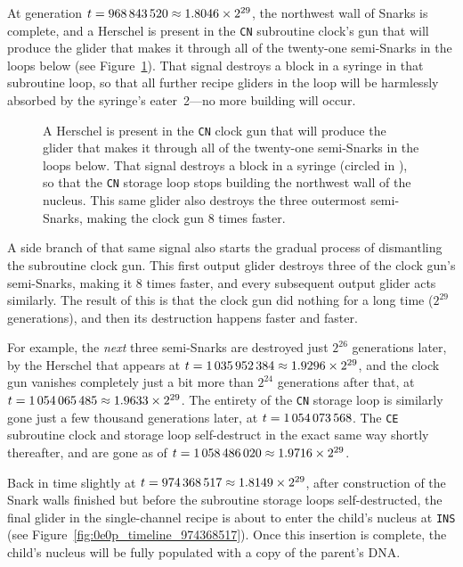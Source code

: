 At generation $t = 968{\,}843{\,}520 \approx 1.8046 \times 2^{29}$, the northwest wall of Snarks is complete, and a Herschel is present in the \texttt{CN} subroutine clock's gun that will produce the glider that makes it through all of the twenty-one semi-Snarks in the loops below (see Figure~\ref{fig:0e0p_timeline_968843520}). That signal destroys a block in a syringe in that subroutine loop, so that all further recipe gliders in the loop will be harmlessly absorbed by the syringe's eater~2---no more building will occur.

\begin{figure}[!htb]
	\centering
	\caption{A Herschel is present in the \texttt{CN} clock gun that will produce the glider that makes it through all of the twenty-one semi-Snarks in the loops below. That signal destroys a block in a syringe (circled in ), so that the \texttt{CN} storage loop stops building the northwest wall of the nucleus. This same glider also destroys the three outermost semi-Snarks, making the clock gun $8$ times faster.}
	\label{fig:0e0p_timeline_968843520}
\end{figure}

A side branch of that same signal also starts the gradual process of dismantling the subroutine clock gun. This first output glider destroys three of the clock gun's semi-Snarks, making it 8 times faster, and every subsequent output glider acts similarly. The result of this is that the clock gun did nothing for a long time ($2^{29}$ generations), and then its destruction happens faster and faster.

For example, the \emph{next} three semi-Snarks are destroyed just $2^{26}$ generations later, by the Herschel that appears at $t = 1{\,}035{\,}952{\,}384 \approx 1.9296 \times 2^{29}$, and the clock gun vanishes completely just a bit more than $2^{24}$ generations after that, at $t = 1{\,}054{\,}065{\,}485 \approx 1.9633 \times 2^{29}$. The entirety of the \texttt{CN} storage loop is similarly gone just a few thousand generations later, at $t = 1{\,}054{\,}073{\,}568$. The \texttt{CE} subroutine clock and storage loop self-destruct in the exact same way shortly thereafter, and are gone as of $t = 1{\,}058{\,}486{\,}020 \approx 1.9716 \times 2^{29}$.

Back in time slightly at $t = 974{\,}368{\,}517 \approx 1.8149 \times 2^{29}$, after construction of the Snark walls finished but before the subroutine storage loops self-destructed, the final glider in the single-channel recipe is about to enter the child's nucleus at \texttt{INS} (see Figure~\ref{fig:0e0p_timeline_974368517}). Once this insertion is complete, the child's nucleus will be fully populated with a copy of the parent's DNA.

